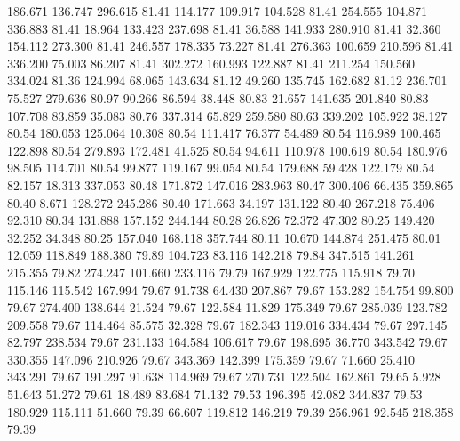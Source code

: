  186.671  136.747  296.615        81.41
 114.177  109.917  104.528        81.41
 254.555  104.871  336.883        81.41
  18.964  133.423  237.698        81.41
  36.588  141.933  280.910        81.41
  32.360  154.112  273.300        81.41
 246.557  178.335   73.227        81.41
 276.363  100.659  210.596        81.41
 336.200   75.003   86.207        81.41
 302.272  160.993  122.887        81.41
 211.254  150.560  334.024        81.36
 124.994   68.065  143.634        81.12
  49.260  135.745  162.682        81.12
 236.701   75.527  279.636        80.97
  90.266   86.594   38.448        80.83
  21.657  141.635  201.840        80.83
 107.708   83.859   35.083        80.76
 337.314   65.829  259.580        80.63
 339.202  105.922   38.127        80.54
 180.053  125.064   10.308        80.54
 111.417   76.377   54.489        80.54
 116.989  100.465  122.898        80.54
 279.893  172.481   41.525        80.54
  94.611  110.978  100.619        80.54
 180.976   98.505  114.701        80.54
  99.877  119.167   99.054        80.54
 179.688   59.428  122.179        80.54
  82.157   18.313  337.053        80.48
 171.872  147.016  283.963        80.47
 300.406   66.435  359.865        80.40
   8.671  128.272  245.286        80.40
 171.663   34.197  131.122        80.40
 267.218   75.406   92.310        80.34
 131.888  157.152  244.144        80.28
  26.826   72.372   47.302        80.25
 149.420   32.252   34.348        80.25
 157.040  168.118  357.744        80.11
  10.670  144.874  251.475        80.01
  12.059  118.849  188.380        79.89
 104.723   83.116  142.218        79.84
 347.515  141.261  215.355        79.82
 274.247  101.660  233.116        79.79
 167.929  122.775  115.918        79.70
 115.146  115.542  167.994        79.67
  91.738   64.430  207.867        79.67
 153.282  154.754   99.800        79.67
 274.400  138.644   21.524        79.67
 122.584   11.829  175.349        79.67
 285.039  123.782  209.558        79.67
 114.464   85.575   32.328        79.67
 182.343  119.016  334.434        79.67
 297.145   82.797  238.534        79.67
 231.133  164.584  106.617        79.67
 198.695   36.770  343.542        79.67
 330.355  147.096  210.926        79.67
 343.369  142.399  175.359        79.67
  71.660   25.410  343.291        79.67
 191.297   91.638  114.969        79.67
 270.731  122.504  162.861        79.65
   5.928   51.643   51.272        79.61
  18.489   83.684   71.132        79.53
 196.395   42.082  344.837        79.53
 180.929  115.111   51.660        79.39
  66.607  119.812  146.219        79.39
 256.961   92.545  218.358        79.39
